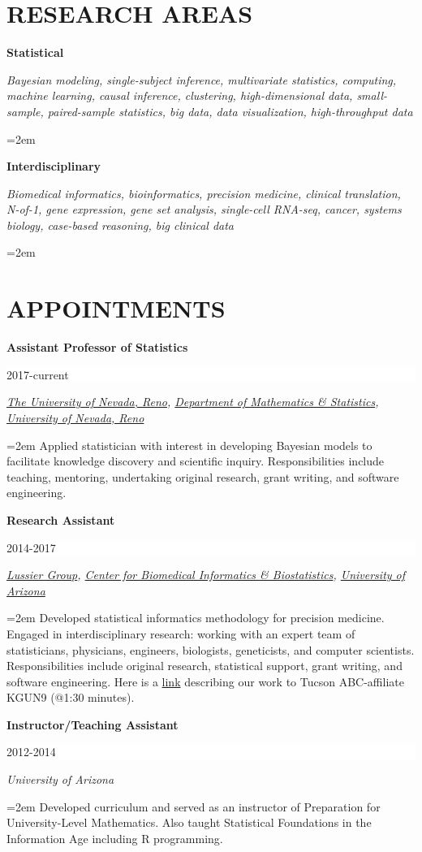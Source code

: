 \documentclass[paper=a4,fontsize=11pt]{scrartcl} %
\newcommand{\sepspace}{\vspace*{1em}}		%
\newcommand{\NewPart}[2]{\section*{\uppercase{#1} #2 }}
\newcommand{\EducationEntry}[4]{
		\noindent \textbf{#1} \hfill      %
		\colorbox{White}{%
			\parbox{6em}{%
			\hfill\color{Black}#2}} \par  %
		\noindent \textit{#3} \par        %
		\noindent\hangindent=2em\hangafter=0 \small #4 %
		\normalsize \par \vspace{-7pt}}
\begin{document}
\NewPart{Research areas}{}
\vspace{-7pt}

\EducationEntry{Statistical}{}{Bayesian modeling, single-subject inference, multivariate statistics, computing, machine learning, causal inference, clustering, high-dimensional data, small-sample, paired-sample statistics, big data, data visualization, high-throughput data}{}

\EducationEntry{Interdisciplinary}{}{Biomedical informatics, bioinformatics, precision medicine, clinical translation, N-of-1, gene expression, gene set analysis, single-cell RNA-seq, cancer, systems biology, case-based reasoning, big clinical data}{}

\NewPart{Appointments}{}
\vspace{-7pt}

\EducationEntry{Assistant Professor of Statistics}{2017-current}{{\href{https://www.unr.edu/}{The University of Nevada, Reno}}, {\href{https://www.unr.edu/math/}{Department of Mathematics \& Statistics}}, {\href{http://www.unr.edu/}{University of Nevada, Reno}}}{Applied statistician with interest in developing Bayesian models to facilitate knowledge discovery and scientific inquiry. Responsibilities include teaching, mentoring, undertaking original research, grant writing, and software engineering.}
\sepspace

\EducationEntry{Research Assistant}{2014-2017}{{\href{http://lussierlab.org/}{Lussier Group}}, {\href{http://cb2.uahs.arizona.edu/}{Center for Biomedical Informatics \& Biostatistics}}, {\href{http://www.arizona.edu/}{University of Arizona}}}{Developed statistical informatics methodology for precision medicine. Engaged in interdisciplinary research: working with an expert team of statisticians, physicians, engineers, biologists, geneticists, and computer scientists. Responsibilities include original research, statistical support, grant writing, and software engineering. Here is a \href{http://cb2.uahs.arizona.edu/news/dr-lussier-and-grant-schissler-speak-big-data-kgun9-local-news}{link} describing our work to Tucson ABC-affiliate KGUN9 (@1:30 minutes).}
\sepspace

\EducationEntry{Instructor/Teaching Assistant}{2012-2014}{University of Arizona}
{Developed curriculum and served as an instructor of Preparation for University-Level Mathematics. Also taught Statistical Foundations in the Information Age including \textsc{R} programming.}
\sepspace
\end{document}
